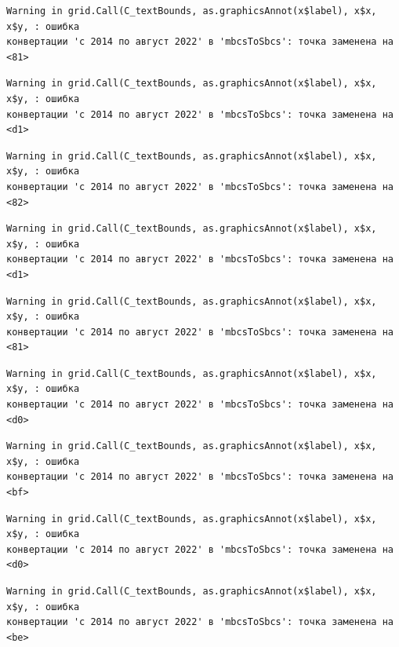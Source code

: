 \documentclass[
  letterpaper,
  DIV=11,
  numbers=noendperiod]{scrreprt}
\begin{document}
\begin{verbatim}
Warning in grid.Call(C_textBounds, as.graphicsAnnot(x$label), x$x, x$y, : ошибка
конвертации 'с 2014 по август 2022' в 'mbcsToSbcs': точка заменена на <81>
\end{verbatim}

\begin{verbatim}
Warning in grid.Call(C_textBounds, as.graphicsAnnot(x$label), x$x, x$y, : ошибка
конвертации 'с 2014 по август 2022' в 'mbcsToSbcs': точка заменена на <d1>
\end{verbatim}

\begin{verbatim}
Warning in grid.Call(C_textBounds, as.graphicsAnnot(x$label), x$x, x$y, : ошибка
конвертации 'с 2014 по август 2022' в 'mbcsToSbcs': точка заменена на <82>
\end{verbatim}

\begin{verbatim}
Warning in grid.Call(C_textBounds, as.graphicsAnnot(x$label), x$x, x$y, : ошибка
конвертации 'с 2014 по август 2022' в 'mbcsToSbcs': точка заменена на <d1>
\end{verbatim}

\begin{verbatim}
Warning in grid.Call(C_textBounds, as.graphicsAnnot(x$label), x$x, x$y, : ошибка
конвертации 'с 2014 по август 2022' в 'mbcsToSbcs': точка заменена на <81>
\end{verbatim}

\begin{verbatim}
Warning in grid.Call(C_textBounds, as.graphicsAnnot(x$label), x$x, x$y, : ошибка
конвертации 'с 2014 по август 2022' в 'mbcsToSbcs': точка заменена на <d0>
\end{verbatim}

\begin{verbatim}
Warning in grid.Call(C_textBounds, as.graphicsAnnot(x$label), x$x, x$y, : ошибка
конвертации 'с 2014 по август 2022' в 'mbcsToSbcs': точка заменена на <bf>
\end{verbatim}

\begin{verbatim}
Warning in grid.Call(C_textBounds, as.graphicsAnnot(x$label), x$x, x$y, : ошибка
конвертации 'с 2014 по август 2022' в 'mbcsToSbcs': точка заменена на <d0>
\end{verbatim}

\begin{verbatim}
Warning in grid.Call(C_textBounds, as.graphicsAnnot(x$label), x$x, x$y, : ошибка
конвертации 'с 2014 по август 2022' в 'mbcsToSbcs': точка заменена на <be>
\end{verbatim}
\end{document}
